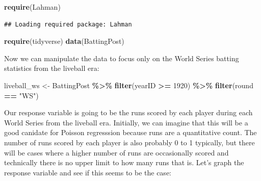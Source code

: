 \documentclass[
]{book}
\newenvironment{Shaded}{\begin{snugshade}}{\end{snugshade}}
\newcommand{\DecValTok}[1]{\textcolor[rgb]{0.00,0.00,0.81}{#1}}
\newcommand{\KeywordTok}[1]{\textcolor[rgb]{0.13,0.29,0.53}{\textbf{#1}}}
\newcommand{\NormalTok}[1]{#1}
\newcommand{\OperatorTok}[1]{\textcolor[rgb]{0.81,0.36,0.00}{\textbf{#1}}}
\newcommand{\StringTok}[1]{\textcolor[rgb]{0.31,0.60,0.02}{#1}}
\begin{document}
\begin{Shaded}
\begin{Highlighting}[]
\KeywordTok{require}\NormalTok{(Lahman)}
\end{Highlighting}
\end{Shaded}

\begin{verbatim}
## Loading required package: Lahman
\end{verbatim}

\begin{Shaded}
\begin{Highlighting}[]
\KeywordTok{require}\NormalTok{(tidyverse)}
\KeywordTok{data}\NormalTok{(BattingPost)}
\end{Highlighting}
\end{Shaded}

Now we can manipulate the data to focus only on the World Series batting statistics from the liveball era:

\begin{Shaded}
\begin{Highlighting}[]
\NormalTok{liveball\_ws \textless{}{-}}\StringTok{ }\NormalTok{BattingPost }\OperatorTok{\%\textgreater{}\%}
\StringTok{  }\KeywordTok{filter}\NormalTok{(yearID }\OperatorTok{\textgreater{}=}\StringTok{ }\DecValTok{1920}\NormalTok{) }\OperatorTok{\%\textgreater{}\%}
\StringTok{  }\KeywordTok{filter}\NormalTok{(round }\OperatorTok{==}\StringTok{ "WS"}\NormalTok{)}
\end{Highlighting}
\end{Shaded}

Our response variable is going to be the runs scored by each player during each World Series from the liveball era. Initially, we can imagine that this will be a good canidate for Poisson regresssion because runs are a quantitative count. The number of runs scored by each player is also probably 0 to 1 typically, but there will be cases where a higher number of runs are occasionally scored and technically there is no upper limit to how many runs that is. Let's graph the response variable and see if this seems to be the case:
\end{document}
